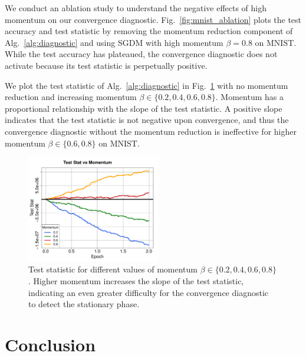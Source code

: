 \documentclass[conference]{IEEEtran}
\begin{document}
We conduct an ablation study to understand the negative effects of high momentum on our convergence diagnostic.
Fig.~\ref{fig:mnist_ablation} plots the test accuracy and test statistic by removing the momentum reduction component of Alg.~\ref{alg:diagnostic} and using SGDM with high momentum $\beta = 0.8$ on MNIST. 
While the test accuracy has plateaued, the convergence diagnostic does not activate because its test statistic is perpetually positive.

We plot the test statistic of Alg.~\ref{alg:diagnostic} in Fig.~\ref{fig:mnist_ablation2} with no momentum reduction and increasing momentum $\beta \in \{0.2, 0.4, 0.6, 0.8\}$.
Momentum has a proportional relationship with the slope of the test statistic. 
A positive slope indicates that the test statistic is not negative upon convergence, and thus the convergence diagnostic without the momentum reduction is ineffective for higher momentum $\beta \in\{ 0.6, 0.8\}$ on MNIST.



\begin{figure}[ht]
\begin{center}
\includegraphics[width=2.3in]{fig/RFig8_IPMom.pdf}
\end{center}
\vspace{-0.15in}
  \caption{
  Test statistic for different values of momentum $\beta \in \{0.2, 0.4, 0.6, 0.8\}$. 
  Higher momentum increases the slope of the test statistic, indicating an even greater difficulty for the convergence diagnostic to detect the stationary phase.
  }
\label{fig:mnist_ablation2}
\end{figure}

\section{Conclusion}
\end{document}
